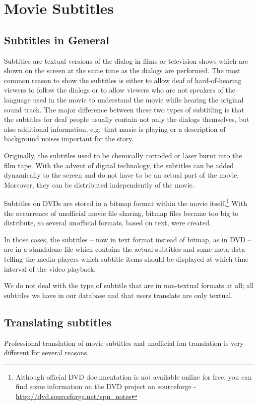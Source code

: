 \section{Movie Subtitles}
\subsection{Subtitles in General}

Subtitles are textual versions of the dialog in films or television shows which are shown on the screen at the same time as the dialogs are performed. The most common reason to show the subtitles is either to allow deaf of hard-of-hearing viewers to follow the dialogs or to allow viewers who are not speakers of the language used in the movie to understand the movie while hearing the original sound track. The major difference between these two types of subtitling is that the subtitles for deaf people usually contain not only the dialogs themselves, but also additional information, e.g.\ that music is playing or a description of background noises important for the story.

Originally, the subtitles used to be chemically corroded or laser burnt into the film tape. With the advent of digital technology, the subtitles can be added dynamically to the screen and do not have to be an actual part of the movie. Moreover, they can be distributed independently of the movie.

Subtitles on DVDs are stored in a bitmap format within the movie itself.\footnote{Although official DVD documentation is not available online for free, you can find some information on the DVD project on sourceforge - \url{http://dvd.sourceforge.net/spu_notes}} With the occurrence of unofficial movie file sharing, bitmap files became too big to distribute, so several unofficial formats, based on text, were created.

In those cases, the subtitles -- now in text format instead of bitmap, as in DVD -- are in a standalone file which contains the actual subtitles and some meta data telling the media players which subtitle items should be displayed at which time interval of the video playback.

We do not deal with the type of subtitle that are in non-textual formats at all; all subtitles we have in our database and that users translate are only textual.

\subsection{Translating subtitles}
Professional translation of movie subtitles and unofficial fan translation is very different for several reasons.

